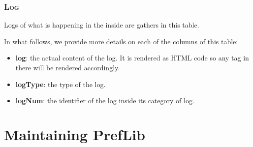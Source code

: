 \documentclass{report}
\begin{document}
	\subsection*{\faDatabase{} \textsc{Log}}
	
	Logs of what is happening in the inside are gathers in this table.
	
	In what follows, we provide more details on each of the columns of this table:
	\begin{itemize}
		\item \textbf{log}: the actual content of the log. It is rendered as HTML code so any tag in there will be rendered accordingly.
		\item \textbf{logType}: the type of the log.
		\item \textbf{logNum}: the identifier of the log inside its category of log.
	\end{itemize}


	\chapter{Maintaining PrefLib}
	
\end{document}

